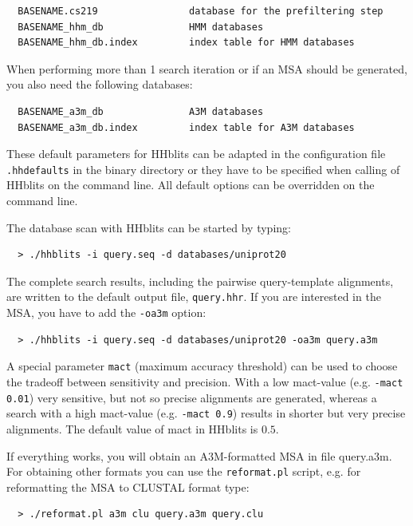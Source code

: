 \documentclass[11pt,a4paper]{article}
\begin{document}
\begin{verbatim}
  BASENAME.cs219                database for the prefiltering step
  BASENAME_hhm_db               HMM databases
  BASENAME_hhm_db.index         index table for HMM databases
\end{verbatim}

When performing more than 1 search iteration or if an MSA should be generated, you also need the 
following databases:

\begin{verbatim}
  BASENAME_a3m_db               A3M databases
  BASENAME_a3m_db.index         index table for A3M databases
\end{verbatim}

These default parameters for HHblits can be adapted in the configuration file 
\verb`.hhdefaults` in the binary directory or they have to be specified when calling of
HHblits on the command line. All default options can be overridden on the command line.

The database scan with HHblits can be started by typing:

\begin{verbatim}
  > ./hhblits -i query.seq -d databases/uniprot20
\end{verbatim}

The complete search results, including the pairwise query-template alignments, are written to 
the default output file, \verb`query.hhr`. If you are interested in the MSA, you have to add the 
\verb`-oa3m` option:

\begin{verbatim}
  > ./hhblits -i query.seq -d databases/uniprot20 -oa3m query.a3m
\end{verbatim}

A special parameter \verb`mact` (maximum accuracy threshold) can be used to choose the tradeoff between sensitivity and 
precision. With a low mact-value (e.g. \verb`-mact 0.01`) very sensitive, but not 
so precise alignments are generated, whereas a search with a high mact-value (e.g. \verb`-mact 0.9`) results in shorter but very precise alignments. The default value of mact in HHblits is $0.5$. 

If everything works, you will obtain an A3M-formatted MSA in file query.a3m. For obtaining
other formats you can use the \verb`reformat.pl` script, e.g. for reformatting the MSA to 
CLUSTAL format type:

\begin{verbatim}
  > ./reformat.pl a3m clu query.a3m query.clu
\end{verbatim}
\end{document}
